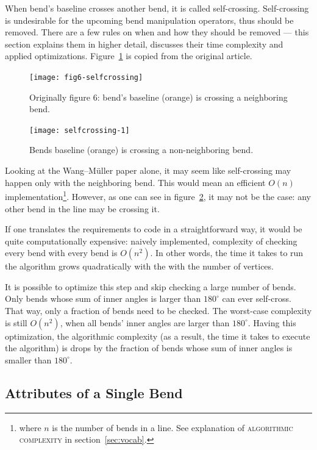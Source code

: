 \documentclass[a4paper]{article}
\newcommand{\WM}{Wang--M{\"u}ller}
\begin{document}
When bend's baseline crosses another bend, it is called self-crossing.
Self-crossing is undesirable for the upcoming bend manipulation operators, thus
should be removed. There are a few rules on when and how they should be removed
--- this section explains them in higher detail, discusses their time
complexity and applied optimizations. Figure~\ref{fig:fig6-selfcrossing} is
copied from the original article.

\begin{figure}[ht]
    \centering
    \texttt{[image: fig6-selfcrossing]}
    \caption{Originally figure 6: bend's baseline (orange) is crossing a neighboring bend.}
    \label{fig:fig6-selfcrossing}
\end{figure}

\begin{figure}[ht]
    \centering
    \texttt{[image: selfcrossing-1]}
    \caption{Bends baseline (orange) is crossing a non-neighboring bend.}
    \label{fig:selfcrossing-1-non-neighbor}
\end{figure}

Looking at the {\WM} paper alone, it may seem like self-crossing may happen
only with the neighboring bend. This would mean an efficient $O(n)$
implementation\footnote{where $n$ is the number of bends in a line. See
explanation of \textsc{algorithmic complexity} in section~\ref{sec:vocab}.}.
However, as one can see in figure~\ref{fig:selfcrossing-1-non-neighbor}, it may
not be the case: any other bend in the line may be crossing it.

If one translates the requirements to code in a straightforward way, it would
be quite computationally expensive: naively implemented, complexity of checking
every bend with every bend is $O(n^2)$. In other words, the time it takes to
run the algorithm grows quadratically with the with the number of vertices.

It is possible to optimize this step and skip checking a large number of bends.
Only bends whose sum of inner angles is larger than $180^\circ$ can ever
self-cross. That way, only a fraction of bends need to be checked. The
worst-case complexity is still $O(n^2)$, when all bends' inner angles are
larger than $180^\circ$. Having this optimization, the algorithmic complexity
(as a result, the time it takes to execute the algorithm) is drops by the
fraction of bends whose sum of inner angles is smaller than $180^\circ$.

\subsection{Attributes of a Single Bend}
\end{document}
